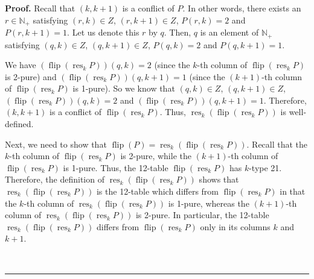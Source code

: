 \documentclass[numbers=enddot,12pt,final,onecolumn,notitlepage]{scrartcl}%
\theoremstyle{definition}
\newenvironment{proof}[1][Proof]{\noindent\textbf{#1.} }{\ \rule{0.5em}{0.5em}}
\begin{document}
\begin{proof}
Recall that $\left(  k,k+1\right)  $ is a conflict of $P$. In other words,
there exists an $r\in\mathbb{N}_{+}$ satisfying $\left(  r,k\right)  \in Z$,
$\left(  r,k+1\right)  \in Z$, $P\left(  r,k\right)  =2$ and $P\left(
r,k+1\right)  =1$. Let us denote this $r$ by $q$. Then, $q$ is an element of
$\mathbb{N}_{+}$ satisfying $\left(  q,k\right)  \in Z$, $\left(
q,k+1\right)  \in Z$, $P\left(  q,k\right)  =2$ and $P\left(  q,k+1\right)
=1$.

We have $\left(  \operatorname*{flip}\left(  \operatorname*{res}%
\nolimits_{k}P\right)  \right)  \left(  q,k\right)  =2$ (since the $k$-th
column of $\operatorname*{flip}\left(  \operatorname*{res}\nolimits_{k}%
P\right)  $ is 2-pure) and $\left(  \operatorname*{flip}\left(
\operatorname*{res}\nolimits_{k}P\right)  \right)  \left(  q,k+1\right)  =1$
(since the $\left(  k+1\right)  $-th column of $\operatorname*{flip}\left(
\operatorname*{res}\nolimits_{k}P\right)  $ is 1-pure). So we know that
$\left(  q,k\right)  \in Z$, $\left(  q,k+1\right)  \in Z$, $\left(
\operatorname*{flip}\left(  \operatorname*{res}\nolimits_{k}P\right)  \right)
\left(  q,k\right)  =2$ and $\left(  \operatorname*{flip}\left(
\operatorname*{res}\nolimits_{k}P\right)  \right)  \left(  q,k+1\right)  =1$.
Therefore, $\left(  k,k+1\right)  $ is a conflict of $\operatorname*{flip}%
\left(  \operatorname*{res}\nolimits_{k}P\right)  $. Thus,
$\operatorname*{res}\nolimits_{k}\left(  \operatorname*{flip}\left(
\operatorname*{res}\nolimits_{k}P\right)  \right)  $ is well-defined.

Next, we need to show that $\operatorname*{flip}\left(  P\right)
=\operatorname*{res}\nolimits_{k}\left(  \operatorname*{flip}\left(
\operatorname*{res}\nolimits_{k}P\right)  \right)  $. Recall that the $k$-th
column of $\operatorname*{flip}\left(  \operatorname*{res}\nolimits_{k}%
P\right)  $ is 2-pure, while the $\left(  k+1\right)  $-th column of
$\operatorname*{flip}\left(  \operatorname*{res}\nolimits_{k}P\right)  $ is
1-pure. Thus, the 12-table $\operatorname*{flip}\left(  \operatorname*{res}%
\nolimits_{k}P\right)  $ has $k$-type 21. Therefore, the definition of
$\operatorname*{res}\nolimits_{k}\left(  \operatorname*{flip}\left(
\operatorname*{res}\nolimits_{k}P\right)  \right)  $ shows that
$\operatorname*{res}\nolimits_{k}\left(  \operatorname*{flip}\left(
\operatorname*{res}\nolimits_{k}P\right)  \right)  $ is the 12-table which
differs from $\operatorname*{flip}\left(  \operatorname*{res}\nolimits_{k}%
P\right)  $ in that the $k$-th column of $\operatorname*{res}_{k}\left(
\operatorname*{flip}\left(  \operatorname*{res}\nolimits_{k}P\right)  \right)
$ is 1-pure, whereas the $\left(  k+1\right)  $-th column of
$\operatorname*{res}\nolimits_{k}\left(  \operatorname*{flip}\left(
\operatorname*{res}\nolimits_{k}P\right)  \right)  $ is 2-pure. In particular,
the 12-table $\operatorname*{res}\nolimits_{k}\left(  \operatorname*{flip}%
\left(  \operatorname*{res}\nolimits_{k}P\right)  \right)  $ differs from
$\operatorname*{flip}\left(  \operatorname*{res}\nolimits_{k}P\right)  $ only
in its columns $k$ and $k+1$.


\end{proof}
\end{document}
